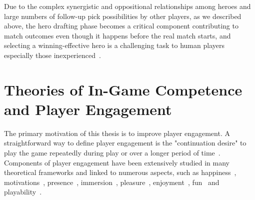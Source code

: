 Due to the complex synergistic and oppositional relationships among heroes and large numbers of follow-up pick possibilities by other players, as we described above, the hero drafting phase becomes a critical component contributing to match outcomes even though it happens before the real match starts, and selecting a winning-effective hero is a challenging task to human players especially those inexperienced~\cite{johnson2015all}. 




\section{Theories of In-Game Competence and Player Engagement}

The primary motivation of this thesis is to improve player engagement. A straightforward way to define player engagement is the "continuation desire" to play the game repeatedly during play or over a longer period of time~\cite{schoenau2011player}. Components of player engagement have been extensively studied in many theoretical frameworks and linked to numerous aspects, such as happiness~\cite{sweetser2005gameflow,flow1990psychology,chen2007flow}, motivations~\cite{przybylski2010motivational,ryan2006motivational,yee2006demographics,yee2006motivations,sherry2006video}, presence~\cite{lombard1997heart,tamborini2006role}, immersion~\cite{mcmahan2003immersion,brown2004grounded,jennett2008measuring,ermi2005fundamental}, pleasure~\cite{costello2009tool}, enjoyment~\cite{ravaja2007fun,klimmt2003dimensions,mekler2014systematic}, fun~\cite{koster2013theory} and playability~\cite{federoff2003improving,federoff2002heuristics,desurvire2004using,nacke2009playability}.

